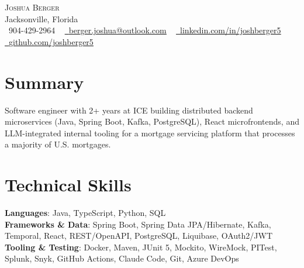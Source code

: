 \documentclass[letterpaper,11pt]{article}
\begin{document}
\begin{center}
    {\Huge \scshape Joshua Berger} \\ \vspace{1pt}
    Jacksonville, Florida \\ \vspace{1pt}
    \small \raisebox{-0.1\height}\faPhone\ 904-429-2964 ~ \href{mailto:berger.joshua@outlook.com}{\raisebox{-0.2\height}\faEnvelope\  \underline{berger.joshua@outlook.com}} ~ 
    \href{https://linkedin.com/in/joshberger5/}{\raisebox{-0.2\height}\faLinkedin\ \underline{linkedin.com/in/joshberger5}}  ~
    \href{https://github.com/joshberger5/}{\raisebox{-0.2\height}\faGithub\ \underline{github.com/joshberger5}}
    \vspace{-8pt}
\end{center}


\section{Summary}
 \begin{itemize}[leftmargin=0.15in, label={}]
    \small{\item{
     Software engineer with 2+ years at ICE building distributed backend microservices (Java, Spring Boot, Kafka, PostgreSQL), React microfrontends, and LLM-integrated internal tooling for a mortgage servicing platform that processes a majority of U.S. mortgages.
    }}
 \end{itemize}
 \vspace{-16pt}

\section{Technical Skills}
 \begin{itemize}[leftmargin=0.15in, label={}]
    \small{\item{
     \textbf{Languages}{: Java, TypeScript, Python, SQL} \\
     \textbf{Frameworks \& Data}{: Spring Boot, Spring Data JPA/Hibernate, Kafka, Temporal, React, REST/OpenAPI, PostgreSQL, Liquibase, OAuth2/JWT} \\
     \textbf{Tooling \& Testing}{: Docker, Maven, JUnit 5, Mockito, WireMock, PITest, Splunk, Snyk, GitHub Actions, Claude Code, Git, Azure DevOps} \\
    }}
 \end{itemize}
 \vspace{-16pt}
\end{document}
